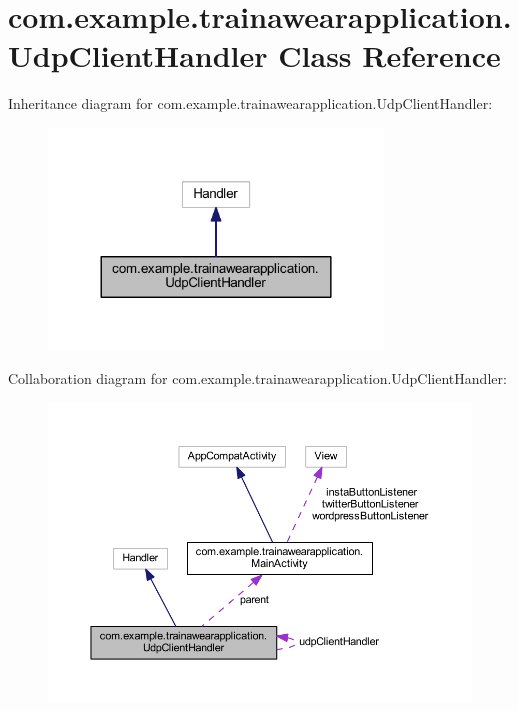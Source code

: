\hypertarget{classcom_1_1example_1_1trainawearapplication_1_1_udp_client_handler}{}\section{com.\+example.\+trainawearapplication.\+Udp\+Client\+Handler Class Reference}
\label{classcom_1_1example_1_1trainawearapplication_1_1_udp_client_handler}


Inheritance diagram for com.\+example.\+trainawearapplication.\+Udp\+Client\+Handler\+:
\nopagebreak
\begin{figure}[H]
\begin{center}
\leavevmode
\includegraphics[width=252pt]{classcom_1_1example_1_1trainawearapplication_1_1_udp_client_handler__inherit__graph}
\end{center}
\end{figure}


Collaboration diagram for com.\+example.\+trainawearapplication.\+Udp\+Client\+Handler\+:
\nopagebreak
\begin{figure}[H]
\begin{center}
\leavevmode
\includegraphics[width=350pt]{classcom_1_1example_1_1trainawearapplication_1_1_udp_client_handler__coll__graph}
\end{center}
\end{figure}
